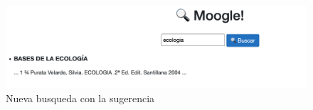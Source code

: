 \documentclass[a4paper,12pt]{article}
\begin{document}
\begin{figure}[h]
    \center
    \includegraphics[width=15cm]{Pictures For Moogle!/Picture4.png}
    \caption{Nueva busqueda con la sugerencia}
\end{figure}
\tableofcontents
\end{document}
